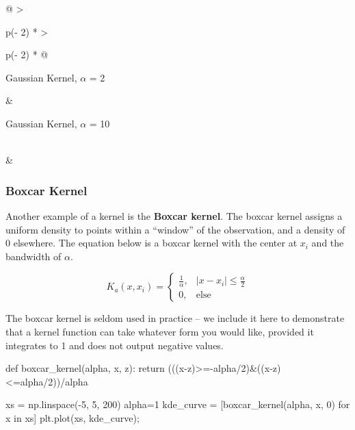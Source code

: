 \documentclass[
  letterpaper,
  DIV=11,
  numbers=noendperiod]{scrreprt}
\newenvironment{Shaded}{\begin{snugshade}}{\end{snugshade}}
\newcommand{\ControlFlowTok}[1]{\textcolor[rgb]{0.00,0.23,0.31}{#1}}
\newcommand{\DecValTok}[1]{\textcolor[rgb]{0.68,0.00,0.00}{#1}}
\newcommand{\KeywordTok}[1]{\textcolor[rgb]{0.00,0.23,0.31}{#1}}
\newcommand{\NormalTok}[1]{\textcolor[rgb]{0.00,0.23,0.31}{#1}}
\newcommand{\OperatorTok}[1]{\textcolor[rgb]{0.37,0.37,0.37}{#1}}
\begin{document}
\begin{longtable}[]{@{}
  >{\raggedright\arraybackslash}p{(\columnwidth - 2\tabcolsep) * }
  >{\raggedright\arraybackslash}p{(\columnwidth - 2\tabcolsep) * }@{}}
\toprule\noalign{}
\begin{minipage}[b]{\linewidth}\raggedright
Gaussian Kernel, \(\alpha\) = 2
\end{minipage} & \begin{minipage}[b]{\linewidth}\raggedright
Gaussian Kernel, \(\alpha\) = 10
\end{minipage} \\
\midrule\noalign{}
\endhead
\bottomrule\noalign{}
\endlastfoot
& \\
\end{longtable}

\subsubsection{Boxcar Kernel}\label{boxcar-kernel}

Another example of a kernel is the \textbf{Boxcar kernel}. The boxcar
kernel assigns a uniform density to points within a ``window'' of the
observation, and a density of 0 elsewhere. The equation below is a
boxcar kernel with the center at \(x_i\) and the bandwidth of
\(\alpha\).

\[K_a(x, x_i) = \begin{cases}
        \frac{1}{\alpha}, & |x - x_i| \le \frac{\alpha}{2}\\
        0, & \text{else }
    \end{cases}\]

The boxcar kernel is seldom used in practice -- we include it here to
demonstrate that a kernel function can take whatever form you would
like, provided it integrates to 1 and does not output negative values.

\begin{Shaded}
\begin{Highlighting}[]
\KeywordTok{def}\NormalTok{ boxcar\_kernel(alpha, x, z):}
    \ControlFlowTok{return}\NormalTok{ (((x}\OperatorTok{{-}}\NormalTok{z)}\OperatorTok{\textgreater{}={-}}\NormalTok{alpha}\OperatorTok{/}\DecValTok{2}\NormalTok{)}\OperatorTok{\&}\NormalTok{((x}\OperatorTok{{-}}\NormalTok{z)}\OperatorTok{\textless{}=}\NormalTok{alpha}\OperatorTok{/}\DecValTok{2}\NormalTok{))}\OperatorTok{/}\NormalTok{alpha}

\NormalTok{xs }\OperatorTok{=}\NormalTok{ np.linspace(}\OperatorTok{{-}}\DecValTok{5}\NormalTok{, }\DecValTok{5}\NormalTok{, }\DecValTok{200}\NormalTok{)}
\NormalTok{alpha}\OperatorTok{=}\DecValTok{1}
\NormalTok{kde\_curve }\OperatorTok{=}\NormalTok{ [boxcar\_kernel(alpha, x, }\DecValTok{0}\NormalTok{) }\ControlFlowTok{for}\NormalTok{ x }\KeywordTok{in}\NormalTok{ xs]}
\NormalTok{plt.plot(xs, kde\_curve)}\OperatorTok{;}
\end{Highlighting}
\end{Shaded}
\end{document}
